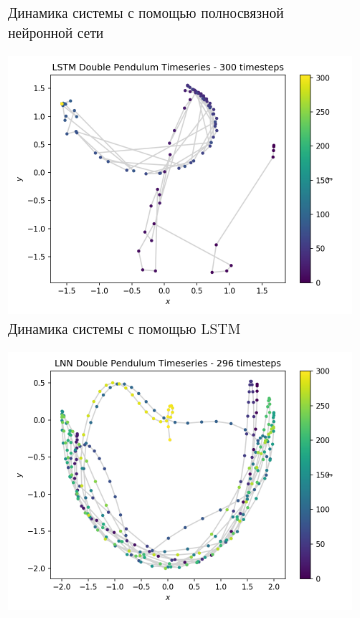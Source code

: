 \documentclass[12pt]{article}
\begin{document}
\begin{figure}[H]
\begin{subfigure}[b]{0.49\textwidth}
			\caption{Динамика системы с помощью полносвязной нейронной сети}
			\label{fig:three sin x}
		\end{subfigure}
				\hfill
				\vfill
		\begin{subfigure}[b]{0.49\textwidth}
			\centering
			\includegraphics[width=\textwidth]{predicted_trajectory_LSTM.png}
			\caption{Динамика системы с помощью LSTM}
			\label{fig:three sin x}
		\end{subfigure}
			\hfill
		\begin{subfigure}[b]{0.49\textwidth}
			\centering
			\includegraphics[width=\textwidth]{predicted_trajectory_LNN.png}

\end{subfigure}
\end{figure}
\end{document}
